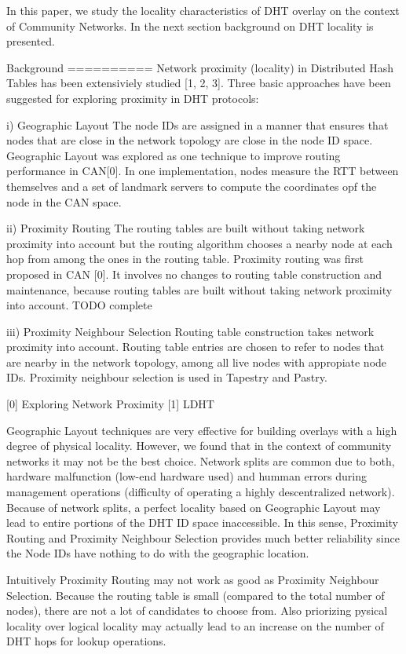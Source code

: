 In this paper, we study the locality characteristics of DHT overlay on the context of Community 
Networks. In the next section background on DHT locality is presented.


Background
==========
Network proximity (locality) in Distributed Hash Tables has been extensiviely studied [1, 2, 3]. 
Three basic approaches have been suggested for exploring proximity in DHT protocols:

i) Geographic Layout
The node IDs are assigned in a manner that ensures that nodes that are close in the 
network topology are close in the node ID space. Geographic Layout was explored as 
one technique to improve routing performance in CAN[0]. In one implementation, 
nodes measure the RTT between themselves and a set of landmark servers to compute 
the coordinates opf the node in the CAN space.

ii) Proximity Routing
The routing tables are built without taking network proximity into account but the 
routing algorithm chooses a nearby node at each hop from among the ones in the 
routing table. Proximity routing was first proposed in CAN [0]. It involves no 
changes to routing table construction and maintenance, because routing tables are 
built without taking network proximity into account. TODO complete

iii) Proximity Neighbour Selection
Routing table construction takes network proximity into account. Routing table 
entries are chosen to refer to nodes that are nearby in the network topology, 
among all live nodes with appropiate node IDs. Proximity neighbour selection is 
used in Tapestry and Pastry.

[0] Exploring Network Proximity
[1] LDHT

Geographic Layout techniques are very effective for building overlays with a 
high degree of physical locality. However, we found that in the context of 
community networks it may not be the best choice. Network splits are common due to both, 
hardware malfunction (low-end hardware used) and humman errors during management 
operations (difficulty of operating a highly descentralized network). Because of network 
splits, a perfect locality based on Geographic Layout may lead to entire portions of the DHT ID space inaccessible. 
In this sense, Proximity Routing and Proximity Neighbour Selection provides much better 
reliability since the Node IDs have nothing to do with the geographic location.

Intuitively Proximity Routing may not work as good as Proximity Neighbour Selection. 
Because the routing table is small (compared to the total number of nodes), there 
are not a lot of candidates to choose from. Also priorizing pysical locality over 
logical locality may actually lead to an increase on the number of DHT hops for 
lookup operations.


